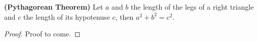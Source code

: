 \guard

\begin{thm}
\label{thm:PythagoreanTheorem}
  \textbf{(Pythagorean Theorem)}
  Let $a$ and $b$ the length of the legs of a right triangle and $c$ the length of its hypotenuse $c$, then $a^2+b^2=c^2$.
\end{thm}
\begin{proof}
  Proof to come.
\end{proof}
